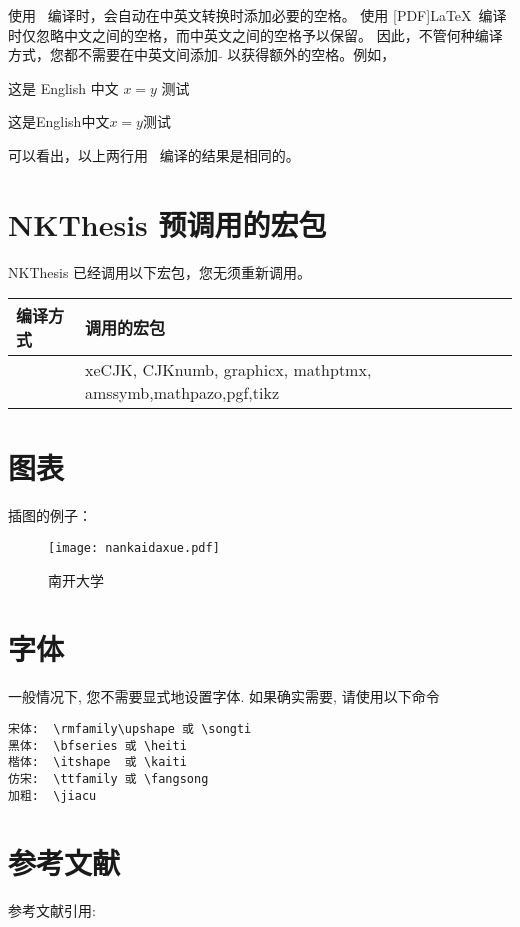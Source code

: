 \documentclass[12pt,openright]{book}
\begin{document}
使用 \XeLaTeX\ 编译时，会自动在中英文转换时添加必要的空格。 使用 [PDF]\LaTeX\
编译时仅忽略中文之间的空格，而中英文之间的空格予以保留。
因此，不管何种编译方式，您都不需要在中英文间添加 $\tilde{}$ 以获得额外的空格。例如，

这是 English 中文 $x=y$ 测试

这是English中文$x=y$测试

可以看出，以上两行用 \XeLaTeX\ 编译的结果是相同的。


\section{NKThesis 预调用的宏包}

NKThesis 已经调用以下宏包，您无须重新调用。

\begin{center}
\begin{tabular}{l|l}
\hline
编译方式 & 调用的宏包\\ \hline
\XeLaTeX & xeCJK, CJKnumb, graphicx, mathptmx, amssymb,mathpazo,pgf,tikz \\ \hline
\end{tabular}
\end{center}


\section{图表}
\label{sec:relatedwork:table}

插图的例子：

\begin{figure}
  \centering
  \texttt{[image: nankaidaxue.pdf]}  
  \caption{\label{fig:nku}南开大学}
\end{figure}

\section{字体}

一般情况下, 您不需要显式地设置字体. 如果确实需要, 请使用以下命令

\begin{verbatim}
宋体:  \rmfamily\upshape 或 \songti
黑体:  \bfseries 或 \heiti
楷体:  \itshape  或 \kaiti
仿宋:  \ttfamily 或 \fangsong
加粗:  \jiacu
\end{verbatim}


\section{参考文献} \label{sec:relatedwork:ref}
参考文献引用:
\cite{ChenCheChen2001,Nadkarni-1992,Hua-Wang-1973}
\cite{ZhuKeZhen,Huo,Example}\cite{JiangXiZhou,Timoshenko,Zhang-Wang,Ding,GB6447-86}
\cite[Theorem 2.1]{ZhuKeZhen}
\end{document}
